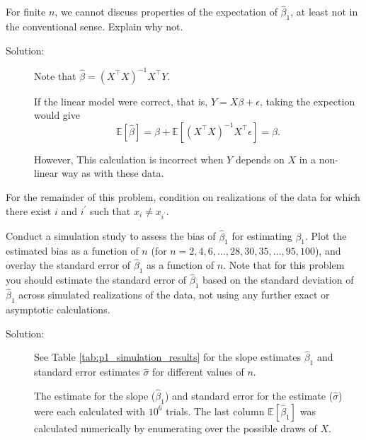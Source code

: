 \documentclass[11pt, letterpaper]{article}
\begin{document}
{\begin{enumerate}[(a)]
{\item For finite $n$, we cannot discuss properties of the expectation of $\hat{\beta}_1$, at least not in the conventional sense.  Explain why not.}

\begin{description}
\item[Solution:] Note that
  $\hat{\beta} = \left(X^\intercal X\right)^{-1} X^\intercal Y$.  

  If the linear model were correct, that is, $Y = X\beta + \epsilon$, taking the
  expection would give
  \begin{equation}
    \mathbb{E}\left[\hat{\beta}\right]
    = \beta + \mathbb{E}\left[
      \left( X^\intercal X \right)^{-1} X^\intercal \epsilon
    \right] = \beta.
  \end{equation}

  However, This calculation is incorrect when $Y$ depends on $X$ in a non-linear
  way as with these data.
\end{description}

\end{enumerate}
For the remainder of this problem, condition on realizations of the data for which there exist $i$ and $i^\prime$ such that $x_i \neq x_{i^\prime}$.
\begin{enumerate}[(a)] \addtocounter{enumi}{4}
{\item Conduct a simulation study to assess the bias of $\hat{\beta}_1$ for estimating $\beta_1$.  Plot the estimated bias as a function of $n$ (for $n=2,4,6,\ldots,28,30,35,\ldots,95,100$), and overlay the standard error of $\hat{\beta}_1$ as a function of $n$.  Note that for this problem you should estimate the standard error of $\hat{\beta}_1$ based on the 
  standard deviation of $\hat{\beta}_1$ across simulated realizations of the data, not using any further exact or asymptotic calculations.}

\begin{description}
\item[Solution:] See Table \ref{tab:p1_simulation_results} for the slope
  estimates $\hat{\beta}_1$ and standard error estimates $\hat{\sigma}$ for
  different values of $n$.

  \begin{table}
    \centering
    
    \caption{The estimate for the slope ($\hat{\beta}_1$) and standard error for
      the estimate ($\hat{\sigma}$) were each calculated with $10^6$ trials. The
      last column $\mathbb{E}\left[\hat{\beta}_1\right]$ was calculated
      numerically by enumerating over the possible draws of $X$.}
    \label{tab:p1_simulation_results}
  \end{table}


\end{description}
\end{enumerate}}
\end{document}
